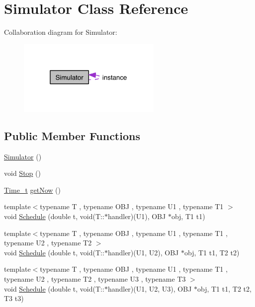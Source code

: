 \hypertarget{class_simulator}{\section{Simulator Class Reference}
\label{class_simulator}
}


Collaboration diagram for Simulator\-:\nopagebreak
\begin{figure}[H]
\begin{center}
\leavevmode
\includegraphics[width=196pt]{class_simulator__coll__graph}
\end{center}
\end{figure}
\subsection*{Public Member Functions}
\begin{DoxyCompactItemize}
\item 
\hyperlink{class_simulator_a031573bfcfe2e0f5c9539bcc1c7fc5d9}{Simulator} ()
\item 
void \hyperlink{class_simulator_ad493423e80256f53c715bb59c16ec78e}{Stop} ()
\item 
\hyperlink{_common_defs_8h_a80b23eab88362163e2edd1a8b8238ef1}{Time\-\_\-t} \hyperlink{class_simulator_a7fe5c584b3fc3f93f5b13e882ca27009}{get\-Now} ()
\item 
{\footnotesize template$<$typename T , typename O\-B\-J , typename U1 , typename T1 $>$ }\\void \hyperlink{class_simulator_a0d67931f9d55c1f284f6467b9015c1c4}{Schedule} (double t, void(T\-::$\ast$handler)(U1), O\-B\-J $\ast$obj, T1 t1)
\item 
{\footnotesize template$<$typename T , typename O\-B\-J , typename U1 , typename T1 , typename U2 , typename T2 $>$ }\\void \hyperlink{class_simulator_a5dc207907f17173964ca9a04d7d4b8fe}{Schedule} (double t, void(T\-::$\ast$handler)(U1, U2), O\-B\-J $\ast$obj, T1 t1, T2 t2)
\item 
{\footnotesize template$<$typename T , typename O\-B\-J , typename U1 , typename T1 , typename U2 , typename T2 , typename U3 , typename T3 $>$ }\\void \hyperlink{class_simulator_a2a00f7c57e142e06046f4df091f0173b}{Schedule} (double t, void(T\-::$\ast$handler)(U1, U2, U3), O\-B\-J $\ast$obj, T1 t1, T2 t2, T3 t3)
\end{DoxyCompactItemize}
